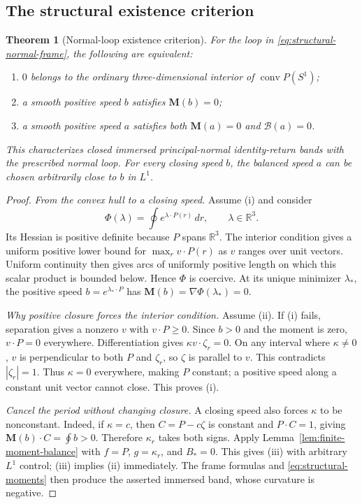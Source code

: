 \documentclass[11pt]{amsart}
\newtheorem{theorem}{Theorem}[section]
\theoremstyle{definition}
\theoremstyle{remark}
\newcommand{\R}{\mathbb R}\newcommand{\Sph}{\mathbb S}
\DeclareMathOperator{\conv}{conv}\DeclareMathOperator{\Stab}{Stab}
\numberwithin{equation}{section}
\begin{document}
\subsection{The structural existence criterion}
\begin{theorem}[Normal-loop existence criterion]\label{thm:normal-loop-criterion}
For the loop in \eqref{eq:structural-normal-frame}, the following are
equivalent:
\begin{enumerate}[label=\textup{(\roman*)}]
\item $0$ belongs to the ordinary three-dimensional interior of
$\conv P(S^1)$;
\item a smooth positive speed $b$ satisfies $\mathbf M(b)=0$;
\item a smooth positive speed $a$ satisfies both
$\mathbf M(a)=0$ and $\mathscr B(a)=0$.
\end{enumerate}
This characterizes closed immersed principal-normal identity-return bands
with the prescribed normal loop. For every closing speed $b$, the balanced
speed $a$ can be chosen arbitrarily close to $b$ in $L^1$.
\end{theorem}
\begin{proof}
\emph{From the convex hull to a closing speed.}
Assume (i) and consider
\[
 \Phi(\lambda)=\oint e^{\lambda\cdot P(r)}\,dr,
 \qquad \lambda\in\R^3.
\]
Its Hessian is positive definite because $P$ spans $\R^3$. The interior
condition gives a uniform positive lower bound for
$\max_r v\cdot P(r)$ as $v$ ranges over unit vectors. Uniform continuity
then gives arcs of uniformly positive length on which this scalar product
is bounded below. Hence $\Phi$ is coercive. At its unique minimizer
$\lambda_*$, the positive speed $b=e^{\lambda_*\cdot P}$ has
$\mathbf M(b)=\nabla\Phi(\lambda_*)=0$.

\emph{Why positive closure forces the interior condition.}
Assume (ii). If (i) fails, separation gives a nonzero $v$ with
$v\cdot P\ge0$. Since $b>0$ and the moment is zero, $v\cdot P=0$
everywhere. Differentiation gives $\kappa v\cdot\zeta_r=0$.
On any interval where $\kappa\ne0$, $v$ is perpendicular to both
$P$ and $\zeta_r$, so $\zeta$ is parallel to $v$. This contradicts
$|\zeta_r|=1$. Thus $\kappa=0$ everywhere, making $P$ constant;
a positive speed along a constant unit vector cannot close. This proves (i).

\emph{Cancel the period without changing closure.}
A closing speed also forces $\kappa$ to be nonconstant. Indeed, if
$\kappa=c$, then $C=P-c\zeta$ is constant and $P\cdot C=1$, giving
$\mathbf M(b)\cdot C=\oint b>0$. Therefore $\kappa_r$ takes both signs.
Apply Lemma~\ref{lem:finite-moment-balance} with $f=P$, $g=\kappa_r$,
and $B_*=0$. This gives (iii) with arbitrary $L^1$ control; (iii) implies
(ii) immediately. The frame formulas and \eqref{eq:structural-moments}
then produce the asserted immersed band, whose curvature is negative.
\end{proof}
\end{document}
